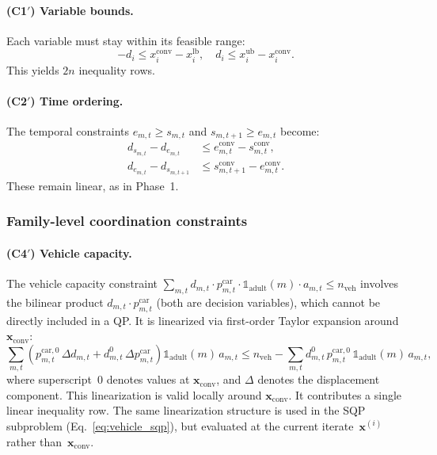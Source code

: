 \documentclass[11pt,a4paper]{article}
\newcommand{\indicator}{\mathbb{1}}
\newcommand{\xconv}{\mathbf{x}_{\mathrm{conv}}}
\begin{document}
\paragraph{(C1$'$) Variable bounds.}
Each variable must stay within its feasible range:
\begin{equation}
    -d_i \leq x_i^{\mathrm{conv}} - x_i^{\mathrm{lb}}, \quad d_i \leq x_i^{\mathrm{ub}} - x_i^{\mathrm{conv}}.
    \label{eq:bounds_d}
\end{equation}
This yields $2n$ inequality rows.

\paragraph{(C2$'$) Time ordering.}
The temporal constraints $e_{m,t} \geq s_{m,t}$ and $s_{m,t+1} \geq e_{m,t}$ become:
\begin{align}
    d_{s_{m,t}} - d_{e_{m,t}} &\leq e^{\mathrm{conv}}_{m,t} - s^{\mathrm{conv}}_{m,t}, \label{eq:time_d1} \\
    d_{e_{m,t}} - d_{s_{m,t+1}} &\leq s^{\mathrm{conv}}_{m,t+1} - e^{\mathrm{conv}}_{m,t}. \label{eq:time_d2}
\end{align}
These remain linear, as in Phase~1.

\subsubsection*{Family-level coordination constraints}

\paragraph{(C4$'$) Vehicle capacity.}
The vehicle capacity constraint $\sum_{m,t} d_{m,t} \cdot p^{\mathrm{car}}_{m,t} \cdot \indicator_{\mathrm{adult}}(m) \cdot a_{m,t} \leq n_{\mathrm{veh}}$ involves the bilinear product $d_{m,t} \cdot p^{\mathrm{car}}_{m,t}$ (both are decision variables), which cannot be directly included in a QP.
It is linearized via first-order Taylor expansion around $\xconv$:
\begin{equation}
    \sum_{m,t} \left( p^{\mathrm{car},0}_{m,t} \, \Delta d_{m,t} + d^{0}_{m,t} \, \Delta p^{\mathrm{car}}_{m,t} \right) \indicator_{\mathrm{adult}}(m) \, a_{m,t}
    \leq n_{\mathrm{veh}} - \sum_{m,t} d^0_{m,t} \, p^{\mathrm{car},0}_{m,t} \, \indicator_{\mathrm{adult}}(m) \, a_{m,t},
    \label{eq:vehicle_d}
\end{equation}
where superscript~$0$ denotes values at $\xconv$, and $\Delta$ denotes the displacement component.
This linearization is valid locally around $\xconv$.
It contributes a single linear inequality row.
The same linearization structure is used in the SQP subproblem (Eq.~\ref{eq:vehicle_sqp}), but evaluated at the current iterate~$\mathbf{x}^{(i)}$ rather than~$\xconv$.
\end{document}
